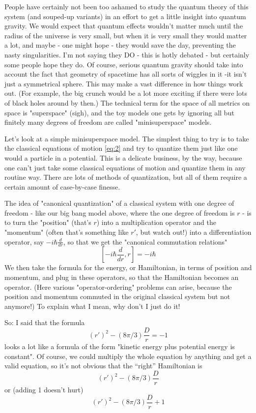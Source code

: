 People have certainly not been too ashamed to study the quantum theory of this system (and souped-up variants) in an effort to get a little insight into quantum gravity. We would expect that quantum effects wouldn't matter much until the radius of the universe is very small, but when it is very small they would matter a lot, and maybe - one might hope - they would save the day, preventing the nasty singularities. I'm not saying they DO - this is hotly debated - but certainly some people hope they do. Of course, serious quantum gravity should take into account the fact that geometry of spacetime has all sorts of wiggles in it -it isn't just a symmetrical sphere. This may make a vast difference in how things work out. (For example, the big crunch would be a lot more exciting if there were lots of black holes around by then.) The technical term for the space of all metrics on space is "superspace" (sigh), and the toy models one gets by ignoring all but finitely many degrees of freedom are called "minisuperspace" models.

Let's look at a simple minisuperspace model. The simplest thing to try is to take the classical equations of motion \eqref{eq:2} and try to quantize them just like one would a particle in a potential. This is a delicate business, by the way, because one can't just take some classical equations of motion and quantize them in any routine way. There are lots of methods of quantization, but all of them require a certain amount of case-by-case finesse.

The idea of "canonical quantization" of a classical system with one degree of freedom - like our big bang model above, where the one degree of freedom is $r$ - is to turn the "position" (that's $r$) into a multiplication operator and the "momentum" (often that's something like $r'$, but watch out!) into a differentiation operator, say $-i\hbar \frac{d}{dr}$, so that we get the "canonical commutation relations"
\[[-i\hbar \frac{d}{dr},r] = -i\hbar\]
We then take the formula for the energy, or Hamiltonian, in terms of position and momentum, and plug in these operators, so that the Hamiltonian becomes an operator. (Here various "operator-ordering" problems can arise, because the position and momentum commuted in the original classical system but not anymore!) To explain what I mean, why don't I just do it!

So: I said that the formula
\begin{equation}
    (r')^2 - (8\pi/3) \frac{D}{r} = -1
\end{equation}
looks a lot like a formula of the form "kinetic energy plus potential energy is constant". Of course, we could multiply the whole equation by anything and get a valid equation, so it's not obvious that the ``right'' Hamiltonian is
\[(r')^2 - (8\pi/3) \frac{D}{r}\]
or (adding 1 doesn't hurt)
\[(r')^2 - (8\pi/3) \frac{D}{r} + 1\]

